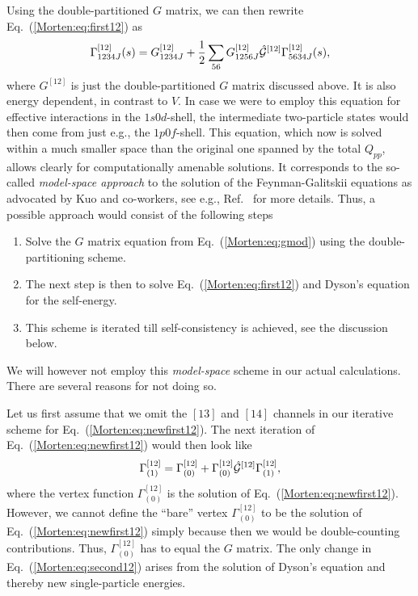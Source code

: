 Using the double-partitioned $G$ matrix, we can then rewrite
Eq.~(\ref{Morten:eq:first12}) as
\begin{equation}
      \Gamma^{[12]}_{1234J}(s) = 
      G^{[12]}_{1234J}+\frac{1}{2}
      \sum_{56}
      G^{[12]}_{1256J}\hat{{\cal G}}^{[12]}
      \Gamma^{[12]}_{5634J}(s),
      \label{Morten:eq:newfirst12}
\end{equation}
where $G^{[12]}$ is just the double-partitioned $G$ matrix
discussed above. It is also energy dependent,
in contrast to $V$.
In case we were to employ this equation for effective
interactions in the $1s0d$-shell, the intermediate two-particle
states would then come from just e.g., the $1p0f$-shell.
This equation, which now is solved within a much smaller space
than the original one spanned by the total $Q_{pp}$, allows
clearly for computationally amenable solutions. It corresponds
to the so-called {\em model-space approach} to the solution
of the Feynman-Galitskii equations 
as advocated by
Kuo and co-workers, see e.g., Ref.~
for more details. Thus, a possible approach would consist
of the following steps 
\begin{enumerate}
\item Solve the $G$ matrix equation from Eq.~(\ref{Morten:eq:gmod})
      using the double-partitioning scheme.
\item The next step is then to solve Eq.~(\ref{Morten:eq:first12})
      and Dyson's equation for the self-energy.
\item This scheme is iterated till self-consistency is achieved,
      see the discussion below. 
\end{enumerate}
We will however not employ this {\em model-space} scheme in our
actual calculations. There are several reasons for not doing so.

Let us first assume that we omit the $[13]$ and $[14]$ channels in our
iterative scheme for Eq.~(\ref{Morten:eq:newfirst12}). 
The next iteration of Eq.~(\ref{Morten:eq:newfirst12}) 
would then look like 
\begin{equation}
      \Gamma^{[12]}_{(1)} = 
      \Gamma_{(0)}^{[12]}+
      \Gamma_{(0)}^{[12]}
       \hat{{\cal G}}^{[12]}\Gamma^{[12]}_{(1)},
      \label{Morten:eq:second12}
\end{equation}
where the vertex function $\Gamma_{(0)}^{[12]}$ is the solution
of Eq.~(\ref{Morten:eq:newfirst12}). However, we cannot define
the ``bare'' vertex $\Gamma_{(0)}^{[12]}$ to be the 
solution  of Eq.~(\ref{Morten:eq:newfirst12}) simply because then we 
would be double-counting contributions.
Thus, $\Gamma_{(0)}^{[12]}$ has to equal the $G$ matrix.
The only change in Eq.~(\ref{Morten:eq:second12}) 
arises from the solution of Dyson's equation
and thereby new single-particle energies. 


